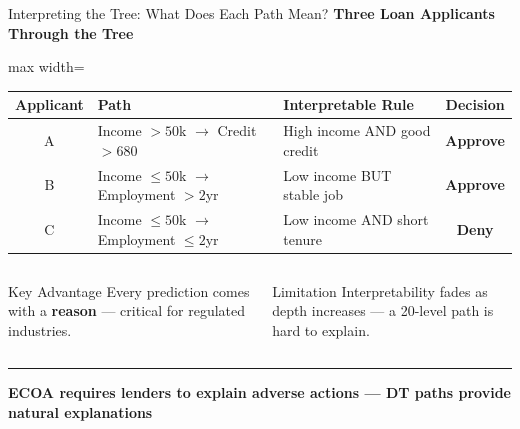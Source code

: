 \documentclass[8pt,aspectratio=169]{beamer}
\newcommand{\bottomnote}[1]{%
\vfill
\vspace{-2mm}
\textcolor{mllavender2}{\rule{\textwidth}{0.4pt}}
\vspace{1mm}
\footnotesize
\textbf{#1}
}
\newcommand{\highlight}[1]{\textcolor{mlorange}{\textbf{#1}}}
\begin{document}
\begin{frame}[t]{Interpreting the Tree: What Does Each Path Mean?}
\small
\textbf{Three Loan Applicants Through the Tree}

\vspace{1mm}
\footnotesize
\begin{adjustbox}{max width=\textwidth}
\begin{tabular}{clp{7cm}c}
\toprule
\textbf{Applicant} & \textbf{Path} & \textbf{Interpretable Rule} & \textbf{Decision} \\
\midrule
A & Income $> 50$k $\to$ Credit $> 680$ & \footnotesize High income AND good credit & \textcolor{mlgreen}{\textbf{Approve}} \\
\rowcolor{mllavender4}
B & Income $\leq 50$k $\to$ Employment $> 2$yr & \footnotesize Low income BUT stable job & \textcolor{mlgreen}{\textbf{Approve}} \\
C & Income $\leq 50$k $\to$ Employment $\leq 2$yr & \footnotesize Low income AND short tenure & \textcolor{dfred}{\textbf{Deny}} \\
\bottomrule
\end{tabular}
\end{adjustbox}

\vspace{3mm}
\begin{columns}[T]
\begin{block}{Key Advantage}
\footnotesize Every prediction comes with a \highlight{reason} --- critical for regulated industries.
\end{block}

\begin{block}{Limitation}
\footnotesize Interpretability fades as depth increases --- a 20-level path is hard to explain.
\end{block}
\end{columns}
\bottomnote{ECOA requires lenders to explain adverse actions --- DT paths provide natural explanations}
\end{frame}
\end{document}
